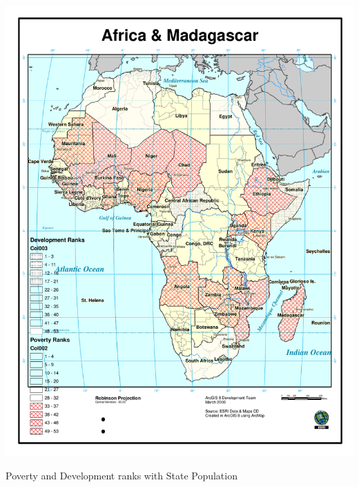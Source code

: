 \includegraphics[width=6in]{Images/GIS/PovertyFeatureMapV2DevelopmentPovertyFloodFill.pdf}

\newpage

Poverty and Development ranks with State Population

